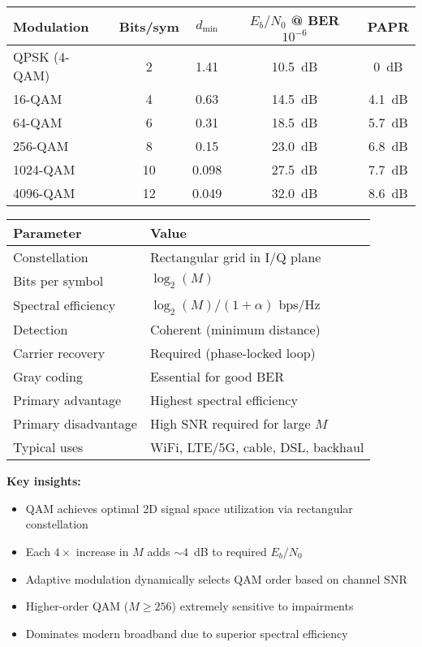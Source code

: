 \begin{center}
\begin{tabular}{@{}lcccc@{}}
\toprule
Modulation & Bits/sym & $d_{\min}$ & $E_b/N_0$ @ BER $10^{-6}$ & PAPR \\
\midrule
QPSK (4-QAM) & 2 & 1.41 & 10.5~dB & 0~dB \\
16-QAM & 4 & 0.63 & 14.5~dB & 4.1~dB \\
64-QAM & 6 & 0.31 & 18.5~dB & 5.7~dB \\
256-QAM & 8 & 0.15 & 23.0~dB & 6.8~dB \\
1024-QAM & 10 & 0.098 & 27.5~dB & 7.7~dB \\
4096-QAM & 12 & 0.049 & 32.0~dB & 8.6~dB \\
\bottomrule
\end{tabular}
\end{center}

\begin{center}
\begin{tabular}{@{}ll@{}}
\toprule
\textbf{Parameter} & \textbf{Value} \\
\midrule
Constellation & Rectangular grid in I/Q plane \\
Bits per symbol & $\log_2(M)$ \\
Spectral efficiency & $\log_2(M)/(1+\alpha)$ bps/Hz \\
Detection & Coherent (minimum distance) \\
Carrier recovery & Required (phase-locked loop) \\
Gray coding & Essential for good BER \\
Primary advantage & Highest spectral efficiency \\
Primary disadvantage & High SNR required for large $M$ \\
Typical uses & WiFi, LTE/5G, cable, DSL, backhaul \\
\bottomrule
\end{tabular}
\end{center}

\textbf{Key insights:}
\begin{itemize}
\item QAM achieves optimal 2D signal space utilization via rectangular constellation
\item Each $4\times$ increase in $M$ adds $\sim$4~dB to required $E_b/N_0$
\item Adaptive modulation dynamically selects QAM order based on channel SNR
\item Higher-order QAM ($M \geq 256$) extremely sensitive to impairments
\item Dominates modern broadband due to superior spectral efficiency
\end{itemize}

